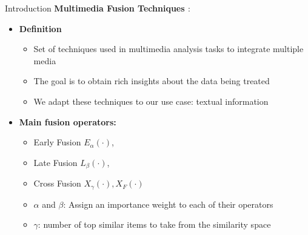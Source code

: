 \documentclass[10pt,xcolor=table]{beamer}
\begin{document}
\begin{frame}{Introduction}
\large \textbf{Multimedia Fusion Techniques \cite{AtreyHEK10,ahn2010link}}:
\begin{itemize}
\item \large \textbf{Definition}
	\begin{itemize}
	\item Set of techniques used in multimedia analysis tasks to integrate multiple media 
	\item The goal is to obtain rich insights about the data being treated
	\item We adapt these techniques to our use case: textual information
	\end{itemize}
\item \textbf{Main fusion operators:}
	\begin{itemize}
	\item Early Fusion $E_\alpha(\cdot)$, 
	\item Late Fusion $L_\beta(\cdot)$, 
	\item Cross Fusion $X_\gamma(\cdot), X_F(\cdot)$
	\item $\alpha$ and $\beta$: Assign an importance weight to each of their operators 
	\item $\gamma$: number of top similar items to take from the similarity space
	\end{itemize}

\end{itemize}
\end{frame}
\end{document}
